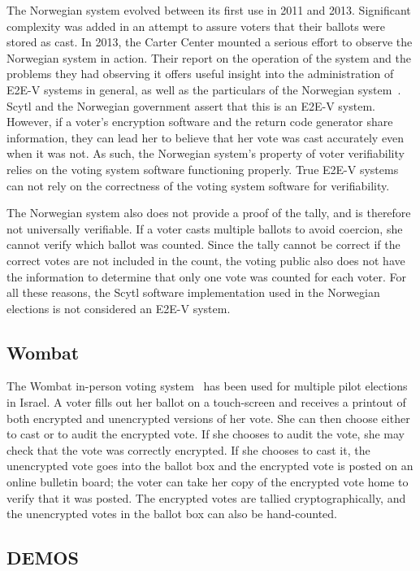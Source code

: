 The Norwegian system evolved between its first use in 2011 and
2013. Significant complexity was added in an attempt to assure voters
that their ballots were stored as cast. In 2013, the Carter Center
mounted a serious effort to observe the Norwegian system in
action. Their report on the operation of the system and the problems
they had observing it offers useful insight into the administration of
E2E-V systems in general, as well as the particulars of the Norwegian
system~\cite{carter2013}. Scytl and the Norwegian government assert
that this is an E2E-V system. However, if a voter's encryption
software and the return code generator share information, they can
lead her to believe that her vote was cast accurately even when it was
not. As such, the Norwegian system's property of voter verifiability
relies on the voting system software functioning properly. True E2E-V
systems can not rely on the correctness of the voting system software
for verifiability.

The Norwegian system also does not provide a proof of the tally, and
is therefore not universally verifiable. If a voter casts multiple
ballots to avoid coercion, she cannot verify which ballot was
counted. Since the tally cannot be correct if the correct votes are
not included in the count, the voting public also does not have the
information to determine that only one vote was counted for each
voter. For all these reasons, the Scytl software implementation used
in the Norwegian elections is not considered an E2E-V system.

\subsection{Wombat}

The Wombat in-person voting system~\cite{rosen2011} has been used for
multiple pilot elections in Israel. A voter fills out her ballot on a
touch-screen and receives a printout of both encrypted and unencrypted
versions of her vote. She can then choose either to cast or to audit
the encrypted vote. If she chooses to audit the vote, she may check
that the vote was correctly encrypted. If she chooses to cast it, the
unencrypted vote goes into the ballot box and the encrypted vote is
posted on an online bulletin board; the voter can take her copy of the
encrypted vote home to verify that it was posted. The encrypted votes
are tallied cryptographically, and the unencrypted votes in the
ballot box can also be hand-counted. 

\subsection{DEMOS}

